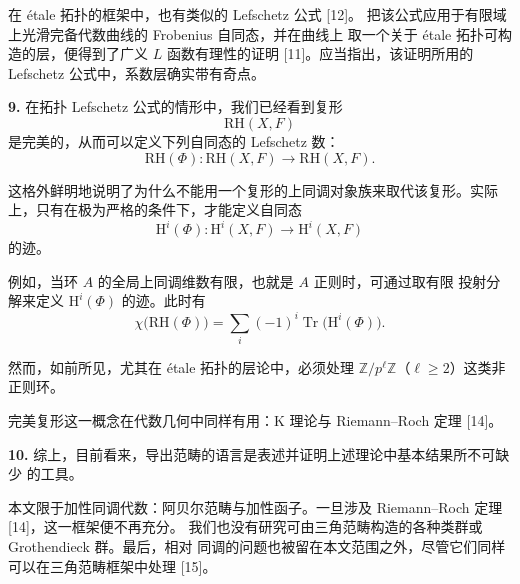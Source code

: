 \clearpage
{}
在 étale 拓扑的框架中，也有类似的 Lefschetz 公式 [12]。
把该公式应用于有限域上光滑完备代数曲线的 Frobenius 自同态，并在曲线上
取一个关于 étale 拓扑可构造的层，便得到了广义 $L$ 函数有理性的证明
[11]。应当指出，该证明所用的 Lefschetz 公式中，系数层确实带有奇点。

\noindent\textbf{9.}\quad
在拓扑 Lefschetz 公式的情形中，我们已经看到复形
\[
\mathrm{RH}(X,F)
\]
是完美的，从而可以定义下列自同态的 Lefschetz 数：
\[
\mathrm{RH}(\Phi)\colon
\mathrm{RH}(X,F)\longrightarrow\mathrm{RH}(X,F).
\]

这格外鲜明地说明了为什么不能用一个复形的上同调对象族来取代该复形。实际
上，只有在极为严格的条件下，才能定义自同态
\[
\mathrm{H}^i(\Phi)\colon
\mathrm{H}^i(X,F)\longrightarrow\mathrm{H}^i(X,F)
\]
的迹。

例如，当环 $A$ 的全局上同调维数有限，也就是 $A$ 正则时，可通过取有限
投射分解来定义 $\mathrm{H}^i(\Phi)$ 的迹。此时有
\[
\chi\bigl(\mathrm{RH}(\Phi)\bigr)
=\sum_i(-1)^i\operatorname{Tr}\bigl(\mathrm{H}^i(\Phi)\bigr).
\]

然而，如前所见，尤其在 étale 拓扑的层论中，必须处理
$\mathbb{Z}/p^\ell\mathbb{Z}$（$\ell\geq 2$）这类非正则环。

完美复形这一概念在代数几何中同样有用：K 理论与 Riemann--Roch 定理 [14]。

\noindent\textbf{10.}\quad
综上，目前看来，导出范畴的语言是表述并证明上述理论中基本结果所不可缺少
的工具。

本文限于加性同调代数：阿贝尔范畴与加性函子。一旦涉及 Riemann--Roch
定理 [14]，这一框架便不再充分。
我们也没有研究可由三角范畴构造的各种类群或 Grothendieck 群。最后，相对
同调的问题也被留在本文范围之外，尽管它们同样可以在三角范畴框架中处理
[15]。
